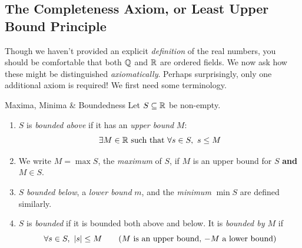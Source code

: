 \clearpage



\subsection[The Completeness Axiom]{The Completeness Axiom, or Least Upper Bound Principle}

Though we haven't provided an explicit \emph{definition} of the real numbers, you should be comfortable that both $\mathbb{Q}$ and $\mathbb{R}$ are ordered fields. We now ask how these might be distinguished \emph{axiomatically}. Perhaps surprisingly, only one additional axiom is required! We first need some terminology.

\begin{defn}{Maxima, Minima \& Boundedness}{}
	Let $S\subseteq\mathbb{R}$ be non-empty.
	\begin{enumerate}\itemsep0pt
		\item $S$ is \emph{bounded above} if it has an \emph{upper bound} $M$:
		\[
			\exists M\in\mathbb{R}\text{ such that }\forall s\in S,\ s\le M
		\]
		\item We write $M=\max S$, the \emph{maximum} of $S$, if $M$ is an upper bound for $S$ \textbf{and} $M\in S$.
		\item $S$ \emph{bounded below}, a \emph{lower bound} $m$, and the \emph{minimum} $\min S$ are defined similarly.
		\item $S$ is \emph{bounded} if it is bounded both above and below. It is \emph{bounded by $M$} if
		\[
			\forall s\in S,\ \left| s\right|\le M \tag{$M$ is an upper bound, $-M$ a lower bound}
		\]
	\end{enumerate}
\end{defn}


